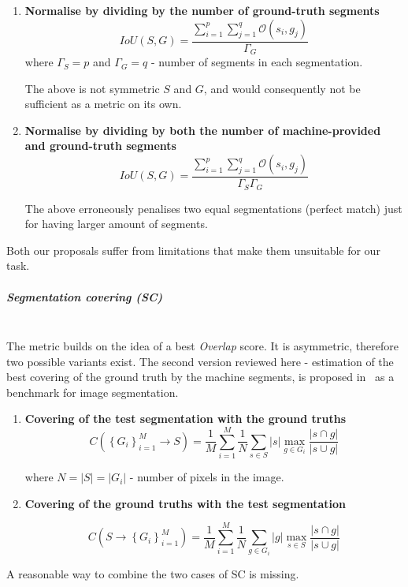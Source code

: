 \begin{enumerate}
\item{\textbf{Normalise by dividing by the number of ground-truth segments}}
\[
IoU(S,G)=\frac{\sum\limits _{i=1}^{p}\sum\limits _{j=1}^{q}\mathcal{O}\left(s_{i},g_{j}\right)}{\Gamma_{G}}
\]
where $\Gamma_{S}=p$ and $\Gamma_{G}=q$ - number of segments in each segmentation.

The above is not symmetric \wrt $S$ and $G$, and would consequently not be sufficient as a metric on its own.

\item{\textbf{Normalise by dividing by both the number of machine-provided and ground-truth segments}}
\[
IoU(S,G)=\frac{\sum\limits _{i=1}^{p}\sum\limits _{j=1}^{q}\mathcal{O}\left(s_{i},g_{j}\right)}{\Gamma_{S}\Gamma_{G}}
\]

The above erroneously penalises two equal segmentations (perfect match) just for having larger amount of segments.
\end{enumerate}
Both our proposals suffer from limitations that make them unsuitable for our task.

\subparagraph*{Segmentation covering (SC)}\mbox{}\\
The metric builds on the idea of a best \textit{Overlap} score. 
It is asymmetric, therefore two possible variants exist. The second version reviewed here - estimation of the best covering of the ground truth by the machine segments, is proposed in~\cite{Arbelaez09} as a benchmark for image segmentation.

\begin{enumerate}
\item{\textbf{Covering of the test segmentation with the ground truths}}
\[
C\left(\left\{ {G_{i}}\right\} _{i=1}^{M}\longrightarrow S\right)=\frac{1}{M}\sum\limits _{i=1}^{M}\frac{1}{N}\sum\limits _{s\in S}\left|s\right|\max_{g\in G_{i}}\frac{\left|s\cap g\right|}{\left|s\cup g\right|}
\]

where $N=\left|S\right|=\left|G_{i}\right|$ - number of pixels in the image.

\item{\textbf{Covering of the ground truths with the test segmentation}}

\[
C\left(S\longrightarrow\left\{ {G_{i}}\right\} _{i=1}^{M}\right)=\frac{1}{M}\sum\limits _{i=1}^{M}\frac{1}{N}\sum\limits _{g\in G_{i}}\left|g\right|\max_{s\in S}\frac{\left|s\cap g\right|}{\left|s\cup g\right|}
\]
\end{enumerate}
A reasonable %
way to combine the two cases of SC is missing.

